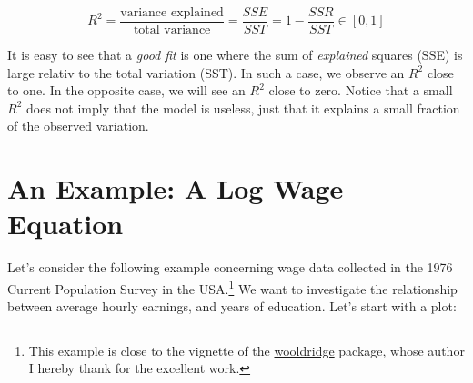\documentclass[]{book}
\begin{document}
\begin{equation}
R^2 = \frac{\text{variance explained}}{\text{total variance}} = \frac{SSE}{SST} = 1 - \frac{SSR}{SST}\in[0,1]  \label{eq:Rsquared}
\end{equation}

It is easy to see that a \emph{good fit} is one where the sum of \emph{explained} squares (SSE) is large relativ to the total variation (SST). In such a case, we observe an \(R^2\) close to one. In the opposite case, we will see an \(R^2\) close to zero. Notice that a small \(R^2\) does not imply that the model is useless, just that it explains a small fraction of the observed variation.

\hypertarget{an-example-a-log-wage-equation}{%
\section{An Example: A Log Wage Equation}\label{an-example-a-log-wage-equation}}

Let's consider the following example concerning wage data collected in the 1976 Current Population Survey in the USA.\footnote{This example is close to the vignette of the \href{https://cloud.r-project.org/web/packages/wooldridge/index.html}{wooldridge} package, whose author I hereby thank for the excellent work.} We want to investigate the relationship between average hourly earnings, and years of education. Let's start with a plot:
\end{document}
